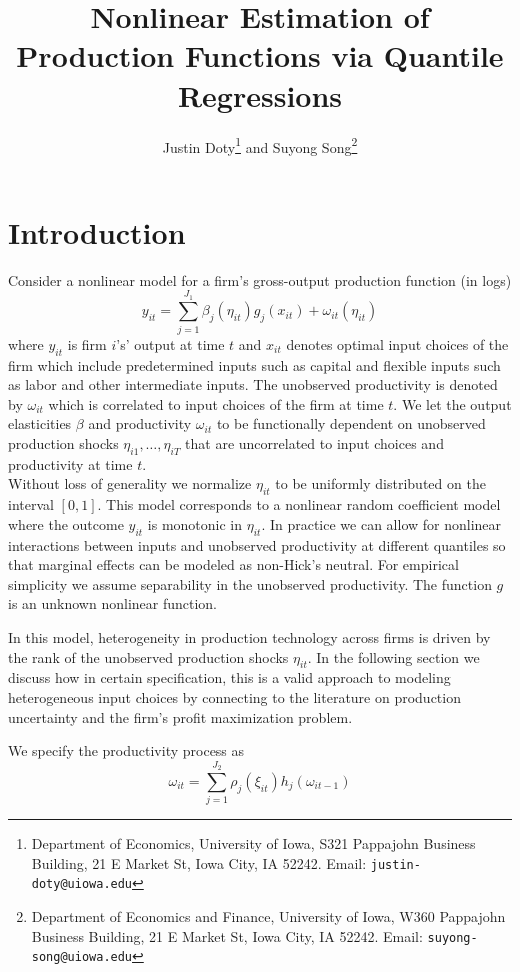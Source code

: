 \documentclass{article}
\title{Nonlinear Estimation of Production Functions via Quantile Regressions}
\author{Justin Doty\thanks{Department of Economics, University of Iowa, S321 Pappajohn Business Building, 21 E Market St, Iowa City, IA 52242. Email: \texttt{justin-doty@uiowa.edu}} and Suyong Song\thanks{Department of Economics and Finance, University of Iowa, W360 Pappajohn Business Building, 21 E Market St, Iowa City, IA 52242. Email: \texttt{suyong-song@uiowa.edu}}
}
\date{\vspace{-5ex}}
\begin{document}
\maketitle{} 
\section{Introduction}

Consider a nonlinear model for a firm's gross-output production function (in logs)
\begin{equation}\label{modely}
y_{it}=\sum_{j=1}^{J_{1}}\beta_{j}(\eta_{it})g_{j}(x_{it})+\omega_{it}(\eta_{it})
\end{equation}
where $y_{it}$ is firm $i$'s' output at time $t$ and $x_{it}$ denotes optimal input choices of the firm which include predetermined inputs such as capital and flexible inputs such as labor and other intermediate inputs. The unobserved productivity is denoted by $\omega_{it}$ which is correlated to input choices of the firm at time $t$. We let the output elasticities $\beta$ and productivity $\omega_{it}$ to be functionally dependent on unobserved production shocks $\eta_{i1},\dots, \eta_{iT}$ that are uncorrelated to input choices and productivity at time $t$.\\

Without loss of generality we normalize $\eta_{it}$ to be uniformly distributed on the interval $[0,1]$. This model corresponds to a nonlinear random coefficient model where the outcome $y_{it}$ is monotonic in $\eta_{it}$. In practice we can allow for nonlinear interactions between inputs and unobserved productivity at different quantiles so that marginal effects can be modeled as non-Hick's neutral. For empirical simplicity we assume separability in the unobserved productivity. The function $g$ is an unknown nonlinear function.

In this model, heterogeneity in production technology across firms is driven by the rank of the unobserved production shocks $\eta_{it}$. In the following section we discuss how in certain specification, this is a valid approach to modeling heterogeneous input choices by connecting to the literature on production uncertainty and the firm's profit maximization problem.

We specify the productivity process as
\begin{equation}\label{modelw}
\omega_{it}=\sum_{j=1}^{J_{2}}\rho_{j}(\xi_{it})h_{j}(\omega_{it-1})
\end{equation}
\end{document}
